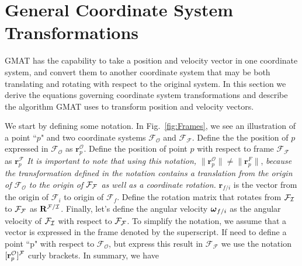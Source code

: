 \section{General Coordinate System \\ Transformations } 

GMAT has the capability to take a position and velocity vector in
one coordinate system, and convert them to another coordinate system
that may be both translating and rotating with respect to the
original system.  In this section we derive the equations governing
coordinate system transformations and describe the algorithm GMAT
uses to transform position and velocity vectors.

We start by defining some notation.  In Fig.~\ref{fig:Frames}, we
see an illustration of a point ``$p$" and two
coordinate systems $\mathcal{F}_\mathcal{O}$ and $\mathcal{F}_\mathcal{F}$.
Define the the position of $p$
expressed in $\mathcal{F}_\mathcal{O}$  as
%
$\mathbf{r}_p^\mathcal{O}$.
%
Define the position of point $p$ with respect to
frame $\mathcal{F}_\mathcal{F}$ as
%
$\mathbf{r}^\mathcal{F}_p$
%
\textit{It is important to
note that using this notation,} $\|\mathbf{r}_p^\mathcal{O} \| \neq \|\mathbf{r}_p^F\|$, \textit{
because the transformation defined in the notation contains a translation from the origin
of $\mathcal{F}_\mathcal{O}$ to the origin of $\mathcal{F}_\mathcal{\mathcal{F}}$ as well as a coordinate rotation.}
$\mathbf{r}_{f/i}$ is the vector from the origin of $\mathcal{F}_i$
to origin of $\mathcal{F}_f$.  Define the rotation matrix that rotates
from $\mathcal{F}_{\mathcal{I}}$ to $\mathcal{F}_{\mathcal{F}}$ as $\mathbf{R}^{\mathcal{F}/\mathcal{I}}$.
Finally, let's define the  angular velocity $\mbox{\boldmath{$\omega
$}}_{f/i}$ as the angular velocity of $\mathcal{F}_{\mathcal{I}}$ with respect to
$\mathcal{F}_{\mathcal{F}}$.  To simplify the notation, we assume that a vector
is expressed in the frame denoted by the superscript.  If need to define a
point ``p" with respect to $\mathcal{F}_\mathcal{O}$, but express this result in
$\mathcal{F}_\mathcal{F}$
we use the notation $[\mathbf{r}_p^\mathcal{O}]^{\mathcal{F}}$
curly brackets.  In summary, we have
%
